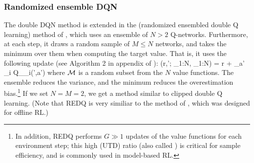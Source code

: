 \subsubsection{Randomized ensemble DQN}
\label{sec:REDQ}

The double DQN method is extended in
the  (randomized ensembled double Q learning)
method of \citep{REDQ},
which uses
an ensemble of  $N>2$ Q-networks.
Furthermore, at each step, it draws a random
sample of $M \leq N$ networks, and takes the minimum over them
when computing the target value.
That is, it uses the following update
(see Algorithm 2 in appendix of \citep{REDQ}):
\be
\TargetV(r,\vs'; \vw_{1:N}, \overline{\vw}_{1:N})
= r + \gamma \max_{a'} \min_{i \in \calM} Q_{\overline{\vw}_i}(\vs',a')
\label{eqn:REDQtabular}
\ee
where $\mathcal{M}$ is a random subset from the $N$ value functions.
The ensemble reduces the variance, and the minimum reduces
the overestimation bias.\footnote{
%
In addition, 
REDQ performs $G \gg 1$  updates of the value functions
for each environment step;
this  high  (UTD) ratio
(also called )
is critical for sample efficiency,
and is commonly used in model-based RL.
}
If we set $N=M=2$, we get a method
similar to clipped double Q learning.
(Note that REDQ is very similiar to the
 method of
\citep{Agarwal2020}, which was designed for offline RL.)






